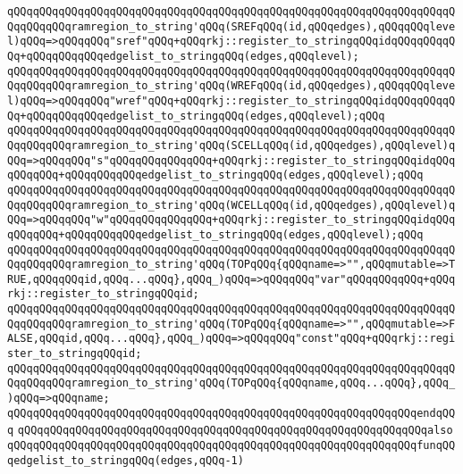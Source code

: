 \verb|qQQqqQQqqQQqqQQqqQQqqQQqqQQqqQQqqQQqqQQqqQQqqQQqqQQqqQQqqQQqqQQqqQQqqQQqqQQqqQQqramregion_to_string'qQQq(SREFqQQq(id,qQQqedges),qQQqqQQqlevel)qQQq=>qQQqqQQq"sref"qQQq+qQQqrkj::register_to_stringqQQqidqQQqqQQqqQQq+qQQqqQQqqQQqedgelist_to_stringqQQq(edges,qQQqlevel);|\newline
\verb|qQQqqQQqqQQqqQQqqQQqqQQqqQQqqQQqqQQqqQQqqQQqqQQqqQQqqQQqqQQqqQQqqQQqqQQqqQQqqQQqramregion_to_string'qQQq(WREFqQQq(id,qQQqedges),qQQqqQQqlevel)qQQq=>qQQqqQQq"wref"qQQq+qQQqrkj::register_to_stringqQQqidqQQqqQQqqQQq+qQQqqQQqqQQqedgelist_to_stringqQQq(edges,qQQqlevel);qQQq|\newline
\newline
\verb|qQQqqQQqqQQqqQQqqQQqqQQqqQQqqQQqqQQqqQQqqQQqqQQqqQQqqQQqqQQqqQQqqQQqqQQqqQQqqQQqramregion_to_string'qQQq(SCELLqQQq(id,qQQqedges),qQQqlevel)qQQq=>qQQqqQQq"s"qQQqqQQqqQQqqQQq+qQQqrkj::register_to_stringqQQqidqQQqqQQqqQQq+qQQqqQQqqQQqedgelist_to_stringqQQq(edges,qQQqlevel);qQQq|\newline
\verb|qQQqqQQqqQQqqQQqqQQqqQQqqQQqqQQqqQQqqQQqqQQqqQQqqQQqqQQqqQQqqQQqqQQqqQQqqQQqqQQqramregion_to_string'qQQq(WCELLqQQq(id,qQQqedges),qQQqlevel)qQQq=>qQQqqQQq"w"qQQqqQQqqQQqqQQq+qQQqrkj::register_to_stringqQQqidqQQqqQQqqQQq+qQQqqQQqqQQqedgelist_to_stringqQQq(edges,qQQqlevel);qQQq|\newline
\newline
\verb|qQQqqQQqqQQqqQQqqQQqqQQqqQQqqQQqqQQqqQQqqQQqqQQqqQQqqQQqqQQqqQQqqQQqqQQqqQQqqQQqramregion_to_string'qQQq(TOPqQQq{qQQqname=>"",qQQqmutable=>TRUE,qQQqqQQqid,qQQq...qQQq},qQQq_)qQQq=>qQQqqQQq"var"qQQqqQQqqQQq+qQQqrkj::register_to_stringqQQqid;|\newline
\verb|qQQqqQQqqQQqqQQqqQQqqQQqqQQqqQQqqQQqqQQqqQQqqQQqqQQqqQQqqQQqqQQqqQQqqQQqqQQqqQQqramregion_to_string'qQQq(TOPqQQq{qQQqname=>"",qQQqmutable=>FALSE,qQQqid,qQQq...qQQq},qQQq_)qQQq=>qQQqqQQq"const"qQQq+qQQqrkj::register_to_stringqQQqid;|\newline
\newline
\verb|qQQqqQQqqQQqqQQqqQQqqQQqqQQqqQQqqQQqqQQqqQQqqQQqqQQqqQQqqQQqqQQqqQQqqQQqqQQqqQQqramregion_to_string'qQQq(TOPqQQq{qQQqname,qQQq...qQQq},qQQq_)qQQq=>qQQqname;|\newline
\verb|qQQqqQQqqQQqqQQqqQQqqQQqqQQqqQQqqQQqqQQqqQQqqQQqqQQqqQQqqQQqqQQqendqQQq|\newline
\newline
\verb|qQQqqQQqqQQqqQQqqQQqqQQqqQQqqQQqqQQqqQQqqQQqqQQqqQQqqQQqqQQqqQQqalso|\newline
\verb|qQQqqQQqqQQqqQQqqQQqqQQqqQQqqQQqqQQqqQQqqQQqqQQqqQQqqQQqqQQqqQQqfunqQQqedgelist_to_stringqQQq(edges,qQQq-1)|\newline
